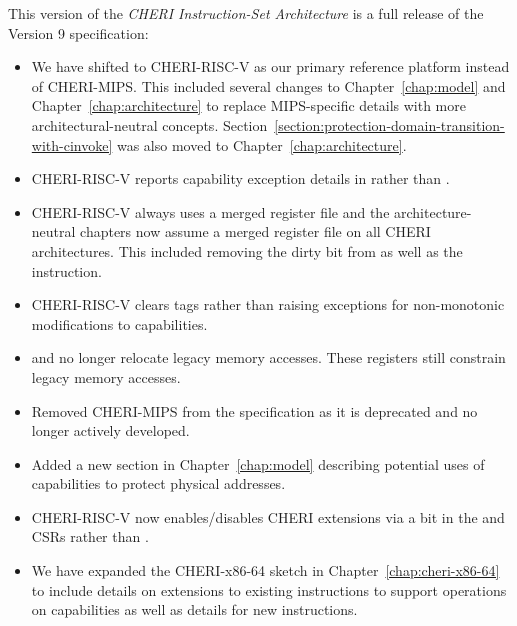 This version of the \textit{CHERI Instruction-Set Architecture} is a full
release of the Version 9 specification:

\begin{itemize}
\item We have shifted to CHERI-RISC-V as our primary reference
  platform instead of CHERI-MIPS.  This included several changes to
  Chapter~\ref{chap:model} and Chapter~\ref{chap:architecture} to
  replace MIPS-specific details with more architectural-neutral
  concepts.
  Section~\ref{section:protection-domain-transition-with-cinvoke} was
  also moved to Chapter~\ref{chap:architecture}.

\item CHERI-RISC-V reports capability exception details in \xtval{}
  rather than \xccsr{}.

\item CHERI-RISC-V always uses a merged register file and the
  architecture-neutral chapters now assume a merged register file on
  all CHERI architectures.  This included removing the dirty bit from
  \xccsr{} as well as the  instruction.

\item CHERI-RISC-V clears tags rather than raising exceptions for
  non-monotonic modifications to capabilities.

\item \DDC{} and \PCC{} no longer relocate legacy memory accesses.
  These registers still constrain legacy memory accesses.

\item Removed CHERI-MIPS from the specification as it is deprecated
  and no longer actively developed.

\item Added a new section in Chapter~\ref{chap:model} describing
  potential uses of capabilities to protect physical addresses.

\item CHERI-RISC-V now enables/disables CHERI extensions via a bit in
  the \menvcfg{} and \senvcfg{} CSRs rather than \xccsr{}.

\item We have expanded the CHERI-x86-64 sketch in
  Chapter~\ref{chap:cheri-x86-64} to include details on extensions to
  existing instructions to support operations on capabilities as well
  as details for new instructions.
\end{itemize}
